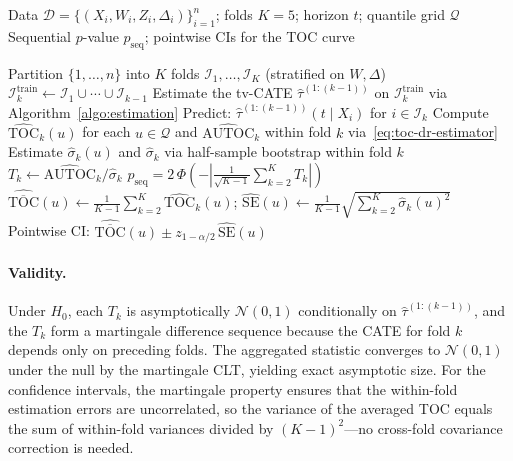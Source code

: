 \documentclass{article}
\newcommand{\hattau}{\hat{\tau}}
\begin{document}
\begin{algorithm}[H]
\caption{Sequential Validation for TOC/AUTOC}
\label{alg:seq-validation-appendix}
\begin{algorithmic}[1]
\Require Data $\mathcal{D} = \{(X_i, W_i, Z_i, \Delta_i)\}_{i=1}^n$; folds $K=5$; horizon $t$; quantile grid $\mathcal{Q}$
\Ensure Sequential $p$-value $p_{\mathrm{seq}}$; pointwise CIs for the TOC curve

\Statex
\State Partition $\{1, \ldots, n\}$ into $K$ folds $\mathcal{I}_1, \ldots, \mathcal{I}_K$ (stratified on $W, \Delta$)
    \State $\mathcal{I}^{\mathrm{train}}_k \gets \mathcal{I}_1 \cup \cdots \cup \mathcal{I}_{k-1}$
    \State Estimate the tv-CATE $\hattau^{(1:(k{-}1))}$ on $\mathcal{I}^{\mathrm{train}}_k$ via Algorithm~\ref{algo:estimation}
    \State Predict: $\hattau^{(1:(k{-}1))}(t \mid X_i)$ for $i \in \mathcal{I}_k$
    \State Compute $\widehat{\mathrm{TOC}}_k(u)$ for each $u \in \mathcal{Q}$ and $\widehat{\mathrm{AUTOC}}_k$ within fold $k$ via~\eqref{eq:toc-dr-estimator}
    \State Estimate $\hat{\sigma}_k(u)$ and $\hat{\sigma}_k$ via half-sample bootstrap within fold $k$
    \State $T_k \gets \widehat{\mathrm{AUTOC}}_k / \hat{\sigma}_k$
\EndFor
\Statex
\State $p_{\mathrm{seq}} = 2\,\Phi\!\left(-\left|\frac{1}{\sqrt{K-1}} \sum_{k=2}^K T_k\right|\right)$
\Statex
{}
    \State $\widehat{\overline{\mathrm{TOC}}}(u) \gets \frac{1}{K-1}\sum_{k=2}^K \widehat{\mathrm{TOC}}_k(u)$; \quad $\widehat{\mathrm{SE}}(u) \gets \frac{1}{K-1}\sqrt{\sum_{k=2}^K \hat{\sigma}_k(u)^2}$
    \State Pointwise CI: $\widehat{\overline{\mathrm{TOC}}}(u) \pm z_{1-\alpha/2}\,\widehat{\mathrm{SE}}(u)$
\EndFor
\end{algorithmic}
\end{algorithm}

\paragraph{Validity.}
Under $H_0$, each $T_k$ is asymptotically $\mathcal{N}(0,1)$ conditionally on $\hattau^{(1:(k-1))}$, and the $T_k$ form a martingale difference sequence because the CATE for fold $k$ depends only on preceding folds. The aggregated statistic converges to $\mathcal{N}(0,1)$ under the null by the martingale CLT, yielding exact asymptotic size. For the confidence intervals, the martingale property ensures that the within-fold estimation errors are uncorrelated, so the variance of the averaged TOC equals the sum of within-fold variances divided by $(K-1)^2$---no cross-fold covariance correction is needed.
\end{document}
